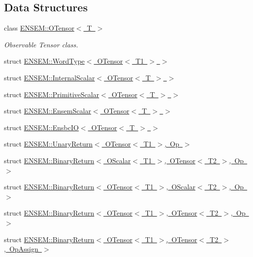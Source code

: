 \subsection*{Data Structures}
\begin{DoxyCompactItemize}
\item 
class \mbox{\hyperlink{classENSEM_1_1OTensor}{E\+N\+S\+E\+M\+::\+O\+Tensor$<$ T $>$}}
\begin{DoxyCompactList}\small\item\em Observable Tensor class. \end{DoxyCompactList}\item 
struct \mbox{\hyperlink{structENSEM_1_1WordType_3_01OTensor_3_01T1_01_4_01_4}{E\+N\+S\+E\+M\+::\+Word\+Type$<$ O\+Tensor$<$ T1 $>$ $>$}}
\item 
struct \mbox{\hyperlink{structENSEM_1_1InternalScalar_3_01OTensor_3_01T_01_4_01_4}{E\+N\+S\+E\+M\+::\+Internal\+Scalar$<$ O\+Tensor$<$ T $>$ $>$}}
\item 
struct \mbox{\hyperlink{structENSEM_1_1PrimitiveScalar_3_01OTensor_3_01T_01_4_01_4}{E\+N\+S\+E\+M\+::\+Primitive\+Scalar$<$ O\+Tensor$<$ T $>$ $>$}}
\item 
struct \mbox{\hyperlink{structENSEM_1_1EnsemScalar_3_01OTensor_3_01T_01_4_01_4}{E\+N\+S\+E\+M\+::\+Ensem\+Scalar$<$ O\+Tensor$<$ T $>$ $>$}}
\item 
struct \mbox{\hyperlink{structENSEM_1_1EnsbcIO_3_01OTensor_3_01T_01_4_01_4}{E\+N\+S\+E\+M\+::\+Ensbc\+I\+O$<$ O\+Tensor$<$ T $>$ $>$}}
\item 
struct \mbox{\hyperlink{structENSEM_1_1UnaryReturn_3_01OTensor_3_01T1_01_4_00_01Op_01_4}{E\+N\+S\+E\+M\+::\+Unary\+Return$<$ O\+Tensor$<$ T1 $>$, Op $>$}}
\item 
struct \mbox{\hyperlink{structENSEM_1_1BinaryReturn_3_01OScalar_3_01T1_01_4_00_01OTensor_3_01T2_01_4_00_01Op_01_4}{E\+N\+S\+E\+M\+::\+Binary\+Return$<$ O\+Scalar$<$ T1 $>$, O\+Tensor$<$ T2 $>$, Op $>$}}
\item 
struct \mbox{\hyperlink{structENSEM_1_1BinaryReturn_3_01OTensor_3_01T1_01_4_00_01OScalar_3_01T2_01_4_00_01Op_01_4}{E\+N\+S\+E\+M\+::\+Binary\+Return$<$ O\+Tensor$<$ T1 $>$, O\+Scalar$<$ T2 $>$, Op $>$}}
\item 
struct \mbox{\hyperlink{structENSEM_1_1BinaryReturn_3_01OTensor_3_01T1_01_4_00_01OTensor_3_01T2_01_4_00_01Op_01_4}{E\+N\+S\+E\+M\+::\+Binary\+Return$<$ O\+Tensor$<$ T1 $>$, O\+Tensor$<$ T2 $>$, Op $>$}}
\item 
struct \mbox{\hyperlink{structENSEM_1_1BinaryReturn_3_01OTensor_3_01T1_01_4_00_01OTensor_3_01T2_01_4_00_01OpAssign_01_4}{E\+N\+S\+E\+M\+::\+Binary\+Return$<$ O\+Tensor$<$ T1 $>$, O\+Tensor$<$ T2 $>$, Op\+Assign $>$}}

\end{DoxyCompactItemize}
